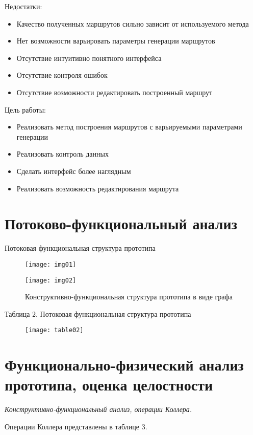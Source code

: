 \noindent Недостатки:
\begin{itemize}
    \item Качество полученных маршрутов сильно зависит от используемого метода
    \item Нет возможности варьировать параметры генерации маршрутов
    \item Отсутствие интуитивно понятного интерфейса
    \item Отсутствие контроля ошибок
    \item Отсутствие возможности редактировать построенный маршрут
\end{itemize}
Цель работы:
\begin{itemize}
    \item Реализовать метод построения маршрутов с варьируемыми параметрами генерации
    \item Реализовать контроль данных
    \item Сделать интерфейс более наглядным
    \item Реализовать возможность редактирования маршрута
\end{itemize}

\chapter{Потоково-функциональный анализ}
Потоковая функциональная структура прототипа 
\begin{figure}[h!]
    \center
    \texttt{[image: img01]}
\end{figure}

\begin{figure}[ht!]
    \center
    \texttt{[image: img02]}
    \caption{Конструктивно-функциональная структура прототипа в виде графа}
\end{figure}

\pagebreak

Таблица 2. Потоковая функциональная структура прототипа
\begin{figure}[h!]
    \center
    \texttt{[image: table02]}
\end{figure}

\chapter{Функционально-физический анализ прототипа, оценка целостности}
\emph{Конструктивно-функциональный анализ, операции Коллера.}

Операции Коллера представлены в таблице 3.

